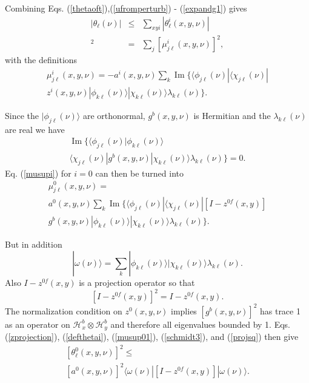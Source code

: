 \documentclass[twocolumn,amsmath,amssymb]{revtex4-1}
\begin{document}
Combining Eqs. (\ref{thetaoft}),(\ref{ufromperturb}) - (\ref{expandg1}) gives
\begin{subequations}
\begin{eqnarray}
\label{thetasum}
|\theta_\ell(\nu)| &\le& \sum_{xyi}|\theta^i_{\ell}(x,y,\nu)|\\ 
\label{defthetai}
[\theta^i_{\ell}( x,y,\nu)]^2 & = & \sum_j [ \mu^i_{j\ell}(x,y,\nu)]^2,
\end{eqnarray}
\end{subequations}
with the definitions
\begin{multline}
\label{musupi}
\mu^i_{j\ell}(x,y,\nu) =  -a^i(x,y,\nu) \sum_k \operatorname{Im}\{ 
 \langle \phi_{j\ell}(\nu)| \langle \chi_{j\ell}(\nu)| \\
z^i(x,y,\nu)|\phi_{k\ell}(\nu) \rangle |\chi_{k\ell}(\nu) \rangle  \lambda_{k\ell}(\nu)\}.
\end{multline}



Since the  $|\phi_{j\ell}(\nu) \rangle $ are orthonormal,
$g^b(x,y,\nu)$ is Hermitian
and the $\lambda_{k\ell}(\nu)$ are real
we have
\begin{multline}
\label{isup01}
\operatorname{Im}\{
 \langle \phi_{j\ell}(\nu)|\phi_{k\ell}(\nu) \rangle \\ \langle \chi_{j\ell}(\nu)|g^b(x,y,\nu)|\chi_{k\ell}(\nu) \rangle  \lambda_{k\ell}(\nu)\} = 0.
\end{multline}
Eq. (\ref{musupi}) for $i = 0$ can then be turned into
\begin{multline}
\label{musup01}
\mu^0_{j\ell}(x,y,\nu) = \\ a^0(x,y,\nu) \sum_k 
 \operatorname{Im}\{
 \langle \phi_{j\ell}(\nu)| \langle \chi_{j\ell}(\nu)| 
[I - z^{0f}(x,y)] \\g^b(x,y,\nu) 
|\phi_{k\ell}(\nu) \rangle |\chi_{k\ell}(\nu) \rangle  \lambda_{k\ell}(\nu)\}.
\end{multline}



But in addition
\begin{equation}
\label{schmidt3}
|\omega( \nu) \rangle  = \sum_k |\phi_{k\ell}(\nu) \rangle |\chi_{k\ell}(\nu) \rangle  \lambda_{k\ell}(\nu).
\end{equation}
Also $I - z^{0f}(x,y)$ is a projection operator so that
\begin{equation}
\label{projsq}
[I - z^{0f}(x,y)]^2 = I - z^{0f}(x,y).
\end{equation}
The normalization condition on $z^0(x,y,\nu)$ implies 
$[g^b(x,y,\nu)]^2$ has trace 1 as an operator on
$\mathcal{H}^b_x \otimes \mathcal{H}^b_y$
and therefore all eigenvalues bounded by 1.
Eqs. (\ref{zprojection}), (\ref{defthetai}), (\ref{musup01}), (\ref{schmidt3}), and
(\ref{projsq}) then give
\begin{multline}
\label{theta0bound}
[\theta^0_{\ell}(x,y,\nu)]^2 \le \\ [a^0(x,y,\nu)]^2  \langle  \omega(\nu)|[I - z^{0f}(x,y)]|\omega(\nu) \rangle .
\end{multline}
\end{document}
